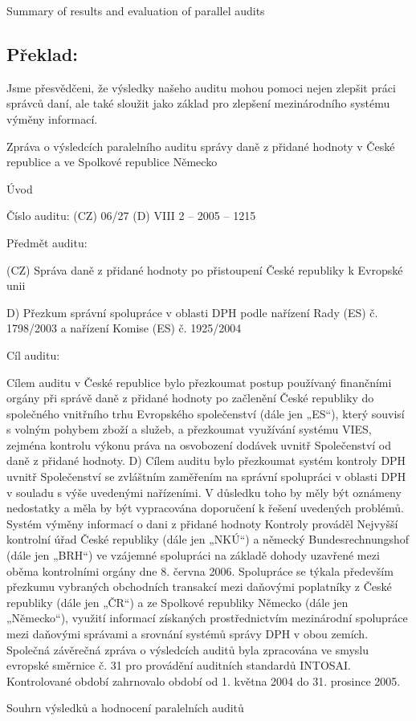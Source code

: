 \documentclass[10pt]{article}
\begin{document}
Summary of results and evaluation of parallel audits



\pagebreak

\subsection*{Překlad:}

Jsme přesvědčeni, že výsledky našeho auditu mohou pomoci nejen zlepšit práci správců daní, ale také sloužit jako základ pro zlepšení mezinárodního systému výměny informací.


Zpráva o výsledcích paralelního auditu správy daně z přidané hodnoty v České republice a ve Spolkové republice Německo



Úvod



Číslo auditu: (CZ) 06/27 (D) VIII 2 – 2005 – 1215



Předmět auditu:



(CZ) Správa daně z přidané hodnoty po přistoupení České republiky k Evropské unii



D) Přezkum správní spolupráce v oblasti DPH podle nařízení Rady (ES) č. 1798/2003 a nařízení Komise (ES) č. 1925/2004



Cíl auditu:

Cílem auditu v České republice bylo přezkoumat postup používaný finančními orgány při správě daně z přidané hodnoty po začlenění České republiky do společného vnitřního trhu Evropského společenství (dále jen „ES“), který souvisí s volným pohybem zboží a služeb, a přezkoumat využívání systému VIES, zejména kontrolu výkonu práva na osvobození dodávek uvnitř Společenství od daně z přidané hodnoty.
D) Cílem auditu bylo přezkoumat systém kontroly DPH uvnitř Společenství se zvláštním zaměřením na správní spolupráci v oblasti DPH v souladu s výše uvedenými nařízeními.
V důsledku toho by měly být oznámeny nedostatky a měla by být vypracována doporučení k řešení uvedených problémů.
Systém výměny informací o dani z přidané hodnoty Kontroly prováděl Nejvyšší kontrolní úřad České republiky (dále jen „NKÚ“) a německý Bundesrechnungshof (dále jen „BRH“) ve vzájemné spolupráci na základě dohody uzavřené mezi oběma kontrolními orgány dne 8. června 2006.
Spolupráce se týkala především přezkumu vybraných obchodních transakcí mezi daňovými poplatníky z České republiky (dále jen „ČR“) a ze Spolkové republiky Německo (dále jen „Německo“), využití informací získaných prostřednictvím mezinárodní spolupráce mezi daňovými správami a srovnání systémů správy DPH v obou zemích.
Společná závěrečná zpráva o výsledcích auditů byla zpracována ve smyslu evropské směrnice č. 31 pro provádění auditních standardů INTOSAI.
Kontrolované období zahrnovalo období od 1. května 2004 do 31. prosince 2005.


Souhrn výsledků a hodnocení paralelních auditů
\end{document}
